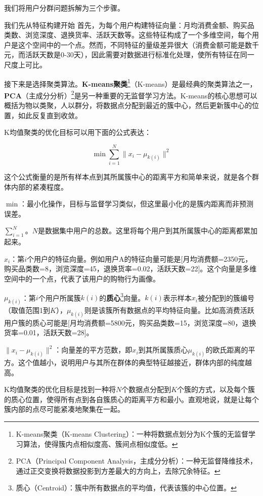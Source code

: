 我们将用户分群问题拆解为三个步骤。

我们先从特征构建开始 首先，为每个用户构建特征向量：月均消费金额、购买品类数、浏览深度、退换货率、活跃天数等。这些特征构成了一个多维空间，每个用户是这个空间中的一个点。然而，不同特征的量级差异很大（消费金额可能是数千元，而活跃天数是0-30天），因此需要对数据进行标准化处理，使所有特征在同一尺度上可比。

接下来是选择聚类算法。\textbf{K-means聚类}\footnote{K-means聚类（K-means Clustering）：一种将数据点划分为K个簇的无监督学习算法，使得簇内点相似度高、簇间点相似度低。}（K-means）是最经典的聚类算法之一，\textbf{PCA}（主成分分析）\footnote{PCA（Principal Component Analysis，主成分分析）：一种无监督降维技术，通过正交变换将数据投影到方差最大的方向上，去除冗余特征。}是另一种重要的无监督学习方法。K-means的核心思想可以概括为物以类聚，人以群分，将数据点分配到最近的簇中心，然后更新簇中心的位置，如此反复直到收敛。

K均值聚类的优化目标可以用下面的公式表达：

\[
\min \sum_{i=1}^{N} \|x_i - \mu_{k(i)}\|^2
\]

这个公式衡量的是所有样本点到其所属簇中心的距离平方和简单来说，就是各个群体内部的紧凑程度。



$\min$：最小化操作，目标与监督学习类似，但这里最小化的是簇内距离而非预测误差。

$\sum_{i=1}^{N}$。$N$是数据集中用户的总数。这里将每个用户到其所属簇中心的距离都累加起来。

$x_i$：第$i$个用户的特征向量。例如用户A的特征向量可能是[月均消费额=2350元，购买品类数=8，浏览深度=45，退换货率=0.02，活跃天数=22]。这个向量是多维空间中的一个点，代表了该用户的购物行为画像。

$\mu_{k(i)}$：第$i$个用户所属簇$k(i)$的\textbf{质心}\footnote{质心（Centroid）：簇中所有数据点的平均值，代表该簇的中心位置。}向量。$k(i)$表示样本$x_i$被分配到的簇编号（取值范围1到$K$），$\mu_{k(i)}$则是该簇所有数据点的平均特征向量。比如高消费活跃用户簇的质心可能是[月均消费额=5800元，购买品类数=15，浏览深度=80，退换货率=0.01，活跃天数=28]。

$\|x_i - \mu_{k(i)}\|^2$：向量差的平方范数，即$x_i$到其所属簇质心$\mu_{k(i)}$的欧氏距离的平方。这个值越小，说明用户与其所在群体的典型特征越接近，群体内部的纯度越高。

K均值聚类的优化目标是找到一种将$N$个数据点分配到$K$个簇的方式，以及每个簇的质心位置，使得所有点到各自簇质心的距离平方和最小。直观地说，就是让每个簇内部的点尽可能紧凑地聚集在一起。

